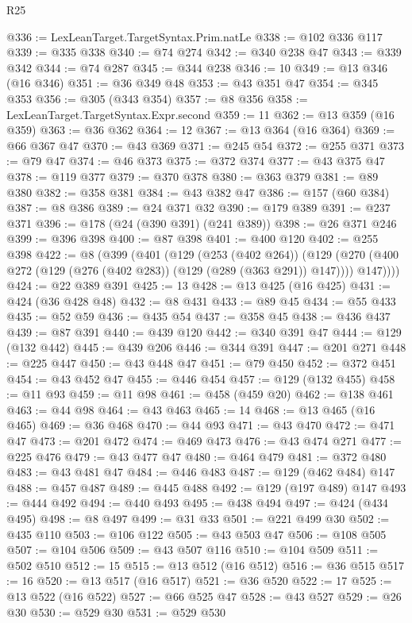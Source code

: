 \begin{lexlean}{R25}
\begin{coremodule}
@336 := LexLeanTarget.TargetSyntax.Prim.natLe
@338 := @102 @336 @117
@339 := @335 @338
@340 := @74 @274
@342 := @340 @238 @47
@343 := @339 @342
@344 := @74 @287
@345 := @344 @238
@346 := 10
@349 := @13 @346 (@16 @346)
@351 := @36 @349 @48
@353 := @43 @351 @47
@354 := @345 @353
@356 := @305 (@343 @354)
@357 := @8 @356
@358 := LexLeanTarget.TargetSyntax.Expr.second
@359 := 11
@362 := @13 @359 (@16 @359)
@363 := @36 @362
@364 := 12
@367 := @13 @364 (@16 @364)
@369 := @66 @367 @47
@370 := @43 @369
@371 := @245 @54
@372 := @255 @371
@373 := @79 @47
@374 := @46 @373
@375 := @372 @374
@377 := @43 @375 @47
@378 := @119 @377
@379 := @370 @378
@380 := @363 @379
@381 := @89 @380
@382 := @358 @381
@384 := @43 @382 @47
@386 := @157 (@60 @384)
@387 := @8 @386
@389 := @24 @371 @32
@390 := @179 @389
@391 := @237 @371
@396 := @178 (@24 (@390 @391) (@241 @389))
@398 := @26 @371 @246
@399 := @396 @398
@400 := @87 @398
@401 := @400 @120
@402 := @255 @398
@422 := @8
    (@399
      (@401
        (@129
          (@253 (@402 @264))
          (@129 (@270 (@400 @272 (@129 (@276 (@402 @283)) (@129 (@289 (@363 @291)) @147)))) @147))))
@424 := @22 @389 @391
@425 := 13
@428 := @13 @425 (@16 @425)
@431 := @424 (@36 @428 @48)
@432 := @8 @431
@433 := @89 @45
@434 := @55 @433
@435 := @52 @59
@436 := @435 @54
@437 := @358 @45
@438 := @436 @437
@439 := @87 @391
@440 := @439 @120
@442 := @340 @391 @47
@444 := @129 (@132 @442)
@445 := @439 @206
@446 := @344 @391
@447 := @201 @271
@448 := @225 @447
@450 := @43 @448 @47
@451 := @79 @450
@452 := @372 @451
@454 := @43 @452 @47
@455 := @446 @454
@457 := @129 (@132 @455)
@458 := @11 @93
@459 := @11 @98
@461 := @458 (@459 @20)
@462 := @138 @461
@463 := @44 @98
@464 := @43 @463
@465 := 14
@468 := @13 @465 (@16 @465)
@469 := @36 @468
@470 := @44 @93
@471 := @43 @470
@472 := @471 @47
@473 := @201 @472
@474 := @469 @473
@476 := @43 @474 @271
@477 := @225 @476
@479 := @43 @477 @47
@480 := @464 @479
@481 := @372 @480
@483 := @43 @481 @47
@484 := @446 @483
@487 := @129 (@462 @484) @147
@488 := @457 @487
@489 := @445 @488
@492 := @129 (@197 @489) @147
@493 := @444 @492
@494 := @440 @493
@495 := @438 @494
@497 := @424 (@434 @495)
@498 := @8 @497
@499 := @31 @33
@501 := @221 @499 @30
@502 := @435 @110
@503 := @106 @122
@505 := @43 @503 @47
@506 := @108 @505
@507 := @104 @506
@509 := @43 @507 @116
@510 := @104 @509
@511 := @502 @510
@512 := 15
@515 := @13 @512 (@16 @512)
@516 := @36 @515
@517 := 16
@520 := @13 @517 (@16 @517)
@521 := @36 @520
@522 := 17
@525 := @13 @522 (@16 @522)
@527 := @66 @525 @47
@528 := @43 @527
@529 := @26 @30
@530 := @529 @30
@531 := @529 @530

\end{coremodule}
\end{lexlean}

